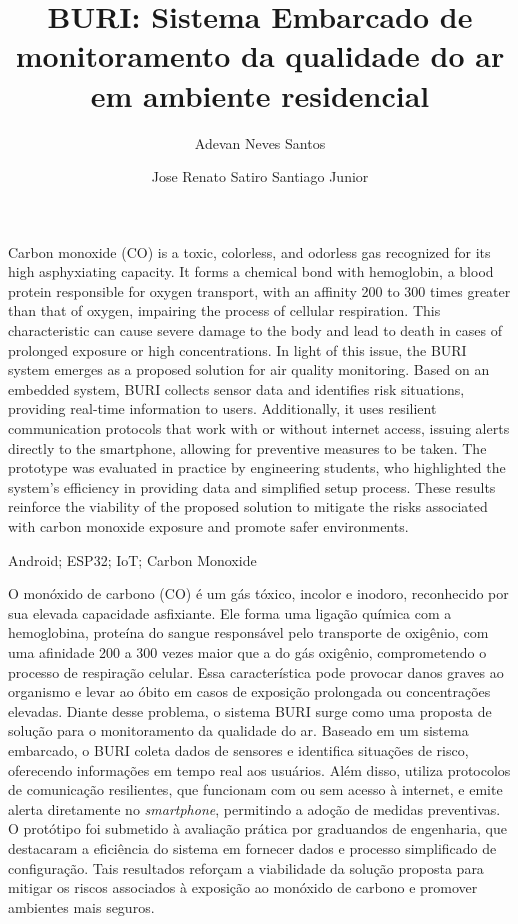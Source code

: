 \documentclass[alpha-refs,brazilian]{RBCA_v3.0}
\title{BURI: Sistema Embarcado de monitoramento da qualidade do ar em ambiente residencial}
\author[1]{Adevan Neves Santos \orcid{0009-0006-2716-5958}}
\author[1]{Jose Renato Satiro Santiago Junior \orcid{0000-0000-0000-0000}}
\affil[1]{Universidade do Estado do Amazonas (UEA)}
\begin{document}
\begin{frontmatter}
	
\maketitle
\thispagestyle{empty}

\begin{Abstract} %
	Carbon monoxide (CO) is a toxic, colorless, and odorless gas recognized for its high asphyxiating capacity. It forms a chemical bond with hemoglobin, a blood protein responsible for oxygen transport, with an affinity 
	200 to 300 times greater than that of oxygen, impairing the process of cellular respiration. This characteristic can cause severe damage to the body and lead to death in cases of prolonged exposure or high concentrations. 
	In light of this issue, the BURI system emerges as a proposed solution for air quality monitoring. Based on an embedded system, BURI collects sensor data and identifies risk situations, providing real-time information to users. 
	Additionally, it uses resilient communication protocols that work with or without internet access, issuing alerts directly to the smartphone, allowing for preventive measures to be taken. The prototype was evaluated in practice 
	by engineering students, who highlighted the system's efficiency in providing data and simplified setup process. These results reinforce the viability of the proposed solution to mitigate the risks associated with carbon monoxide 
	exposure and promote safer environments.
\end{Abstract}

\begin{keywords}
	Android; ESP32; IoT; Carbon Monoxide
\end{keywords}

\begin{resumo} %
	O monóxido de carbono (CO) é um gás tóxico, incolor e inodoro, reconhecido por sua elevada capacidade asfixiante. Ele forma uma ligação química com a hemoglobina, proteína do sangue responsável pelo transporte 
	de oxigênio, com uma afinidade 200 a 300 vezes maior que a do gás oxigênio, comprometendo o processo de respiração celular. Essa característica pode provocar danos graves ao organismo e levar ao óbito em casos 
	de exposição prolongada ou concentrações elevadas. Diante desse problema, o sistema BURI surge como uma proposta de solução para o monitoramento da qualidade do ar. Baseado em um sistema embarcado, o BURI coleta 
	dados de sensores e identifica situações de risco, oferecendo informações em tempo real aos usuários. Além disso, utiliza protocolos de comunicação resilientes, que funcionam com ou sem acesso à internet, e emite 
	alerta diretamente no \textit{smartphone}, permitindo a adoção de medidas preventivas. O protótipo foi submetido à avaliação prática por graduandos de engenharia, que destacaram a eficiência do sistema em fornecer 
	dados e processo simplificado de configuração. Tais resultados reforçam a viabilidade da solução proposta para mitigar os riscos associados à exposição ao monóxido de carbono e promover ambientes mais seguros.
\end{resumo}


\end{frontmatter}
\end{document}
